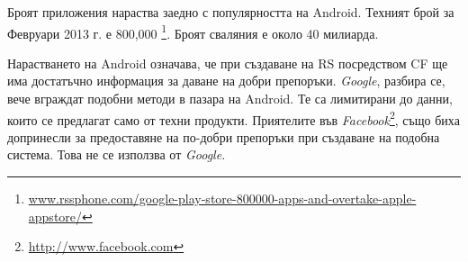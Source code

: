 		Броят приложения нараства заедно с популярността на Android. Техният брой за Февруари 2013 г. е 800,000 \footnote{\url{www.rssphone.com/google-play-store-800000-apps-and-overtake-apple-appstore/}}. Броят сваляния е около 40 милиарда.
		
		Нарастването на Android означава, че при създаване на \ac{RS} посредством \ac{CF} ще има достатъчно информация за даване на добри препоръки.
		\emph{Google}, разбира се, вече вграждат подобни методи в пазара на Android. Те са лимитирани до данни, които се предлагат само от техни продукти. Приятелите във \emph{Facebook}\footnote{\url{http://www.facebook.com}}, също биха допринесли за предоставяне на по-добри препоръки при създаване на подобна система. Това не се използва от \emph{Google}.